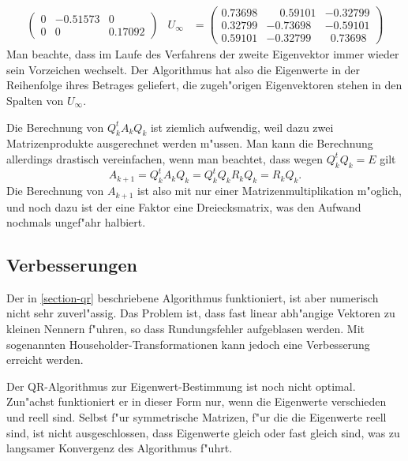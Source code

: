 \begin{beispiel}
\begin{align*}
\begin{pmatrix}
   0& -0.51573&0\\
   0& 0&  0.17092
\end{pmatrix}&
U_\infty&=\begin{pmatrix}
   0.73698& \phantom{-}0.59101& -0.32799\\
   0.32799& -0.73698& -0.59101\\
   0.59101& -0.32799& \phantom{0}0.73698
\end{pmatrix}
\end{align*}
Man beachte, dass im Laufe des Verfahrens der zweite Eigenvektor
immer wieder sein Vorzeichen wechselt.
Der Algorithmus hat also die Eigenwerte in der Reihenfolge
ihres Betrages geliefert, die zugeh"origen Eigenvektoren
stehen in den Spalten von $U_\infty$.
\end{beispiel}

Die Berechnung von $Q_k^tA_kQ_k$ ist ziemlich aufwendig, weil dazu
zwei Matrizenprodukte ausgerechnet werden m"ussen. Man kann die
Berechnung allerdings drastisch vereinfachen, wenn man beachtet,
dass wegen $Q_k^tQ_k=E$ gilt
\[
A_{k+1}=Q_k^tA_kQ_k=Q_k^tQ_kR_kQ_k=R_kQ_k.
\]
Die Berechnung von $A_{k+1}$ ist also mit nur einer Matrizenmultiplikation
m"oglich, und noch dazu ist der eine Faktor eine Dreiecksmatrix, was den
Aufwand nochmals ungef"ahr halbiert.

\subsection{Verbesserungen}
Der in \ref{section-qr} beschriebene Algorithmus funktioniert, ist
aber numerisch nicht sehr zuverl"assig. Das Problem ist, dass fast
linear abh"angige Vektoren zu kleinen Nennern f"uhren, so dass
Rundungsfehler aufgeblasen werden.
Mit sogenannten Householder-Transformationen kann jedoch eine 
Verbesserung erreicht werden.

Der QR-Algorithmus zur Eigenwert-Bestimmung ist noch nicht optimal.
Zun"achst funktioniert er in dieser Form nur, wenn die Eigenwerte
verschieden und reell sind. Selbst f"ur symmetrische Matrizen,
f"ur die die Eigenwerte reell sind, ist nicht ausgeschlossen, dass
Eigenwerte gleich oder fast gleich sind, was zu langsamer
Konvergenz des Algorithmus f"uhrt.

